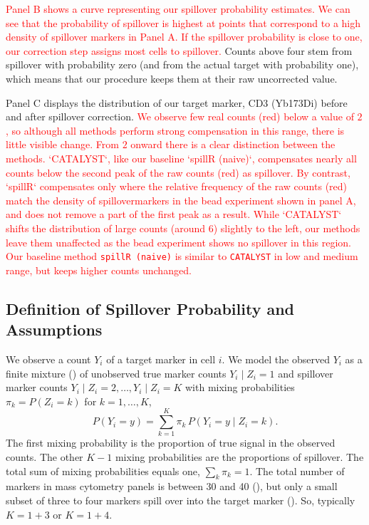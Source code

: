\documentclass[
]{article}
\begin{document}
\textcolor{red}{Panel B shows a curve representing our spillover probability estimates. We can see that the probability of spillover is highest at points that correspond to a high density of spillover markers in Panel A. If the spillover probability is close to one, our correction step assigns most cells to spillover.} Counts above four stem from spillover with probability zero (and from the actual target with probability one), which means that our procedure keeps them at their raw uncorrected value.

Panel C displays the distribution of our target marker, CD3 (Yb173Di) before and after spillover correction. \textcolor{red}{We observe few real counts (red) below a value of $2$, so although all methods perform strong compensation in this range, there is little visible change. From $2$ onward there is a clear distinction between the methods. `CATALYST`, like our baseline `spillR (naive)`, compensates nearly all counts below the second peak of the raw counts (red) as spillover. By contrast, `spillR` compensates only where the relative frequency of the raw counts (red) match the density of spillovermarkers in the bead experiment shown in panel A, and does not remove a part of the first peak as a result. While `CATALYST` shifts the distribution of large counts (around 6) slightly to the left, our methods leave them unaffected as the bead experiment shows no spillover in this region.}
\textcolor{red}{
Our baseline method \texttt{spillR (naive)} is similar to \texttt{CATALYST} in low and medium range, but keeps higher counts unchanged.
}

\subsection{Definition of Spillover Probability and Assumptions}\label{definition-of-spillover-probability-and-assumptions}

We observe a count \(Y_i\) of a target marker in cell \(i\). We model the observed \(Y_i\) as a finite mixture () of unobserved true marker counts \(Y_i \mid Z_i = 1\) and spillover marker counts \(Y_i \mid Z_i = 2, \dots, Y_i \mid Z_i = K\) with mixing probabilities \(\pi_{k} = P(Z_i = k)\) for \(k = 1, \dots, K\),
\[
P(Y_i = y) = \sum_{k = 1}^K \pi_k \, P(Y_i = y \mid Z_i = k).
\]
The first mixing probability is the proportion of true signal in the observed counts. The other \(K-1\) mixing probabilities are the proportions of spillover. The total sum of mixing probabilities equals one, \(\sum_k \pi_k = 1\). The total number of markers in mass cytometry panels is between 30 and 40 (), but only a small subset of three to four markers spill over into the target marker (). So, typically \(K = 1+3\) or \(K = 1+4\).
\end{document}
